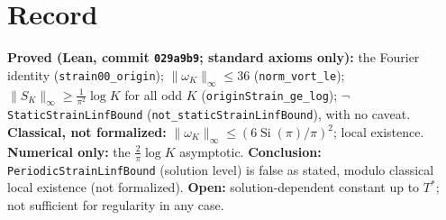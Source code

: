 \documentclass[11pt]{article}
\theoremstyle{definition}\newtheorem{definition}{Definition}
\begin{document}
\section{Record}
\textbf{Proved (Lean, commit \texttt{029a9b9}; standard axioms only):} the Fourier identity (\texttt{strain00\_origin}); $\|\omega_K\|_\infty\le36$ (\texttt{norm\_vort\_le}); $\|S_K\|_\infty\ge\tfrac1{\pi^2}\log K$ for all odd $K$ (\texttt{originStrain\_ge\_log}); $\neg$\texttt{StaticStrainLinfBound} (\texttt{not\_staticStrainLinfBound}), with no caveat. \textbf{Classical, not formalized:} $\|\omega_K\|_\infty\le(6\operatorname{Si}(\pi)/\pi)^2$; local existence. \textbf{Numerical only:} the $\tfrac2\pi\log K$ asymptotic. \textbf{Conclusion:} \texttt{PeriodicStrainLinfBound} (solution level) is false as stated, modulo classical local existence (not formalized). \textbf{Open:} solution-dependent constant up to $T^*$; not sufficient for regularity in any case.
\end{document}
